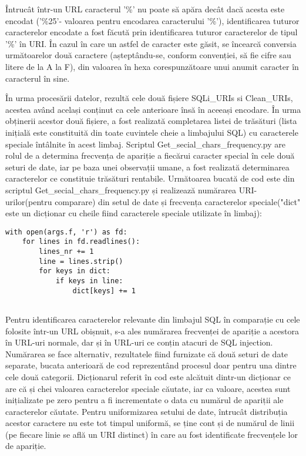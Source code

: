 Întrucât într-un URL caracterul '\%' nu poate să apăra decât dacă acesta este encodat ('\%25'- valoarea pentru encodarea caracterului '\%'), identificarea tuturor caracterelor encodate a fost făcută prin identificarea tuturor caracterelor de tipul '\%' în URI. În cazul în care un astfel de caracter este găsit, se încearcă conversia următoarelor două caractere (așteptându-se, conform convenției, să fie cifre sau litere de la A la F), din valoarea în hexa corespunzătoare unui anumit caracter în caracterul în sine. 

  
În urma procesării datelor, rezultă cele două fișiere  SQLi\_URIs si Clean\_URIs,  acestea având același conținut ca cele anterioare însă în aceeași encodare. În urma obținerii acestor două fișiere, a fost realizată completarea listei de trăsături (lista inițială este constituită din toate cuvintele cheie a limbajului SQL) cu caracterele speciale întâlnite în acest limbaj. Scriptul  Get\_secial\_chars\_frequency.py  are rolul de a determina frecvența de apariție a fiecărui caracter special în cele două seturi de date, iar pe baza unei observații umane, a fost realizată determinarea caracterelor ce constituie trăsături rentabile. Următoarea bucată de cod este din scriptul Get\_secial\_chars\_frequency.py  și realizează numărarea URI-urilor(pentru comparare) din setul de date și frecvența caracterelor speciale("dict" este un dicționar cu cheile fiind caracterele speciale utilizate în limbaj): 
\lstset{language=python,frame=single, showstringspaces=false}
\begin{lstlisting}
with open(args.f, 'r') as fd:
    for lines in fd.readlines():
        lines_nr += 1
        line = lines.strip()
        for keys in dict:
            if keys in line:
                dict[keys] += 1
                
\end{lstlisting}

Pentru identificarea caracterelor relevante din limbajul SQL în comparație cu cele folosite într-un URL obișnuit, s-a ales numărarea frecvenței de apariție a acestora în URL-uri normale, dar și în URL-uri ce conțin atacuri de SQL injection. Numărarea se face alternativ, rezultatele fiind furnizate că două seturi de date separate, bucata anterioară de cod reprezentând procesul doar pentru una dintre cele două categorii. Dicționarul referit în cod este alcătuit dintr-un dicționar ce are că și chei valoarea caracterelor speciale căutate, iar ca valoare, acestea sunt inițializate pe zero pentru a fi incrementate o data cu numărul de apariții ale caracterelor căutate. Pentru uniformizarea setului de date, întrucât distribuția acestor caractere nu este tot timpul uniformă, se ține cont și de numărul de linii (pe fiecare linie se află un URI distinct) în care au fost identificate frecvențele lor de apariție. 

